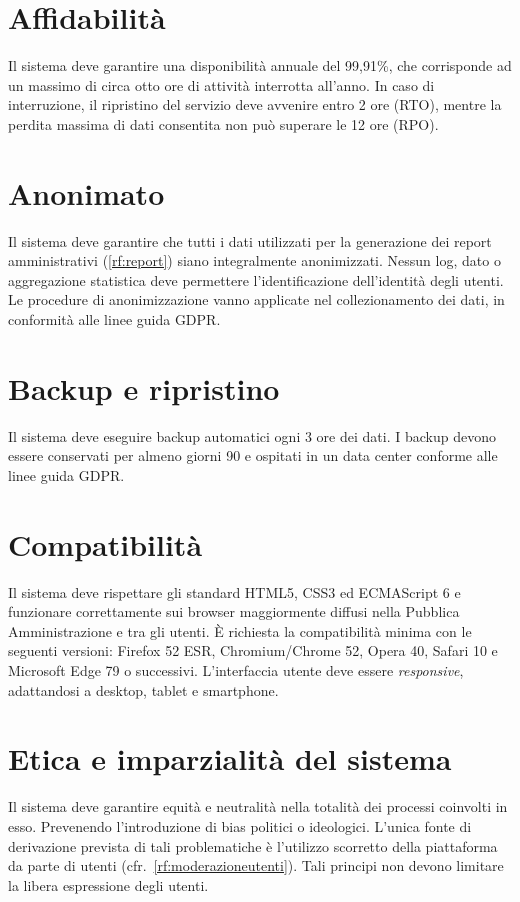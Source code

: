 \begin{rnfscope}

\section{Affidabilità} \label{rnf:affidabilita}
Il sistema deve garantire una disponibilità annuale del 99,91\%, che corrisponde ad un massimo di circa otto ore di attività interrotta all'anno.
In caso di interruzione, il ripristino del servizio deve avvenire entro 2 ore (RTO), mentre la perdita massima di dati consentita non può superare le 12 ore (RPO).

\section{Anonimato} \label{rnf:anonimato}
Il sistema deve garantire che tutti i dati utilizzati per la generazione dei report amministrativi (\ref{rf:report}) siano integralmente anonimizzati.
Nessun log, dato o aggregazione statistica deve permettere l'identificazione dell'identità degli utenti.
Le procedure di anonimizzazione vanno applicate nel collezionamento dei dati, in conformità alle linee guida GDPR\@.

\section{Backup e ripristino} \label{rnf:backup}
Il sistema deve eseguire backup automatici ogni 3 ore dei dati. I backup devono essere conservati per almeno giorni 90 e ospitati in un data center conforme alle linee guida GDPR\@.

\section{Compatibilità} \label{rnf:compatibilita}
Il sistema deve rispettare gli standard HTML5, CSS3 ed ECMAScript 6 e funzionare correttamente sui browser maggiormente diffusi nella Pubblica Amministrazione e tra gli utenti.
È richiesta la compatibilità minima con le seguenti versioni: Firefox 52 ESR, Chromium/Chrome 52, Opera 40, Safari 10 e Microsoft Edge 79 o successivi.
L’interfaccia utente deve essere \emph{responsive}, adattandosi a desktop, tablet e smartphone.

\section{Etica e imparzialità del sistema} \label{rnf:etica}
Il sistema deve garantire equità e neutralità nella totalità dei processi coinvolti in esso.
Prevenendo l'introduzione di bias politici o ideologici.
L'unica fonte di derivazione prevista di tali problematiche è l'utilizzo scorretto della piattaforma da parte di utenti (cfr.~\ref{rf:moderazioneutenti}).
Tali principi non devono limitare la libera espressione degli utenti.



\end{rnfscope}
